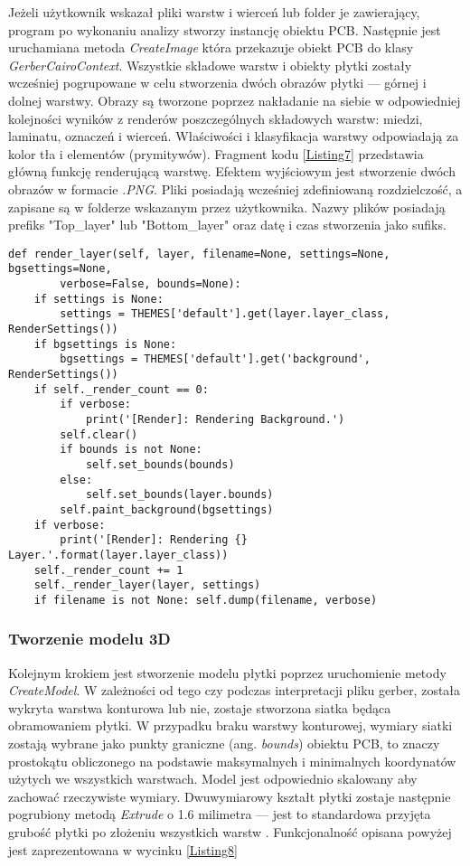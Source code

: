 \documentclass{xmgr}
\begin{document}
Jeżeli użytkownik wskazał pliki warstw i wierceń lub folder je zawierający, program po wykonaniu analizy stworzy instancję obiektu PCB. Następnie jest uruchamiana metoda \emph{CreateImage} która przekazuje obiekt PCB do klasy \emph{GerberCairoContext}. Wszystkie składowe warstw i obiekty płytki zostały wcześniej pogrupowane w celu stworzenia dwóch obrazów płytki --- górnej i dolnej warstwy. Obrazy są tworzone poprzez nakładanie na siebie w odpowiedniej kolejności wyników z renderów poszczególnych składowych warstw: miedzi, laminatu, oznaczeń i wierceń. Właściwości i klasyfikacja warstwy odpowiadają za kolor tła i elementów (prymitywów). Fragment kodu \ref{Listing7} przedstawia główną funkcję renderującą warstwę.
Efektem wyjściowym jest stworzenie dwóch obrazów w formacie \emph{.PNG}. Pliki posiadają wcześniej zdefiniowaną rozdzielczość, a zapisane są w folderze wskazanym przez użytkownika. Nazwy plików posiadają prefiks "Top\_layer" lub "Bottom\_layer" oraz datę i czas stworzenia jako sufiks. 

\begin{lstlisting}
def render_layer(self, layer, filename=None, settings=None, bgsettings=None,
		verbose=False, bounds=None):
    if settings is None:
        settings = THEMES['default'].get(layer.layer_class, RenderSettings())
    if bgsettings is None:
        bgsettings = THEMES['default'].get('background', RenderSettings())
    if self._render_count == 0:
        if verbose:
            print('[Render]: Rendering Background.')
        self.clear()
        if bounds is not None:
            self.set_bounds(bounds)
        else:
            self.set_bounds(layer.bounds)
        self.paint_background(bgsettings)
    if verbose:
        print('[Render]: Rendering {} Layer.'.format(layer.layer_class))
    self._render_count += 1
    self._render_layer(layer, settings)
    if filename is not None: self.dump(filename, verbose)
\end{lstlisting}

\subsubsection{Tworzenie modelu 3D}
Kolejnym krokiem jest stworzenie modelu płytki poprzez uruchomienie metody \emph{CreateModel}. W zależności od tego czy podczas interpretacji pliku gerber, została wykryta warstwa konturowa lub nie, zostaje stworzona siatka będąca obramowaniem płytki. W przypadku braku warstwy konturowej, wymiary siatki zostają wybrane jako punkty graniczne (ang. \emph{bounds}) obiektu PCB, to znaczy prostokątu obliczonego na podstawie maksymalnych i minimalnych koordynatów użytych we wszystkich warstwach. Model jest odpowiednio skalowany aby zachować rzeczywiste wymiary. Dwuwymiarowy kształt płytki zostaje następnie pogrubiony metodą \emph{Extrude} o 1.6 milimetra --- jest to standardowa przyjęta grubość płytki po złożeniu wszystkich warstw \cite{Khandpur}. Funkcjonalność opisana powyżej jest zaprezentowana w wycinku \ref{Listing8}
\end{document}
